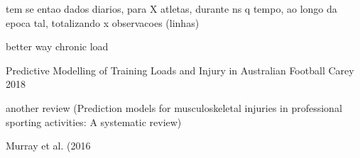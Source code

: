 \documentclass[conference]{IEEEtran}
\begin{document}
tem se entao dados diarios, para X atletas, durante ns q tempo, ao longo da epoca tal, totalizando x observacoes (linhas)

\cite{Williams17} better way chronic load

\cite{Carey_2018} Predictive Modelling of Training Loads and Injury in Australian Football Carey 2018

\cite{Seow20} another review (Prediction models for musculoskeletal injuries in professional sporting activities: A systematic review)

\cite{Murray16} Murray et al. (2016







\end{document}
